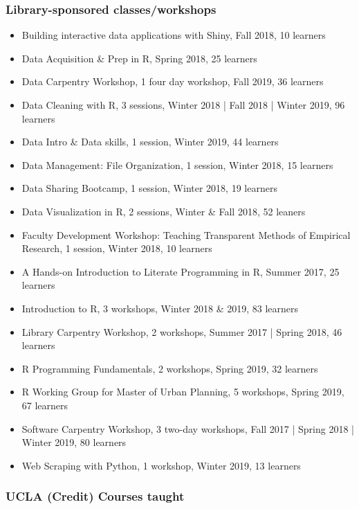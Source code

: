 \subsubsection{Library-sponsored classes/workshops}

\begin{itemize}[label={}, leftmargin=!,labelindent=5pt,itemindent=-15pt]
  \item Building interactive data applications with Shiny, Fall 2018,	10 learners
  \item Data Acquisition \& Prep in R, Spring 2018, 25 learners
  \item Data Carpentry Workshop, 1 four day workshop, Fall 2019,	36 learners
  \item Data Cleaning with R,	3 sessions,	Winter 2018 | Fall 2018 | Winter 2019, 96 learners
  \item Data Intro \& Data skills, 1 session, Winter 2019,	44 learners
  \item Data Management: File Organization,	1 session, Winter 2018,	15 learners
  \item Data Sharing Bootcamp, 1 session, Winter 2018, 19 learners
  \item Data Visualization in R, 2 sessions, Winter \& Fall 2018, 52 leaners
  \item Faculty Development Workshop: Teaching Transparent Methods of Empirical Research, 1 session, Winter 2018,	10 learners
  \item A Hands-on Introduction to Literate Programming in R, Summer 2017, 25 learners
  \item Introduction to R, 3 workshops, Winter 2018 \& 2019, 83 learners
  \item Library Carpentry Workshop, 2 workshops, Summer 2017 | Spring 2018, 46 learners
  \item R Programming Fundamentals,	2 workshops,	Spring 2019, 32 learners
  \item R Working Group for Master of Urban Planning, 5 workshops, Spring 2019,	67 learners
  \item Software Carpentry Workshop, 3 two-day workshops, Fall 2017 | Spring 2018 | Winter 2019, 80 learners
  \item Web Scraping with Python,	1	workshop, Winter 2019, 13 learners
\end{itemize}

\subsubsection{UCLA (Credit) Courses taught}

